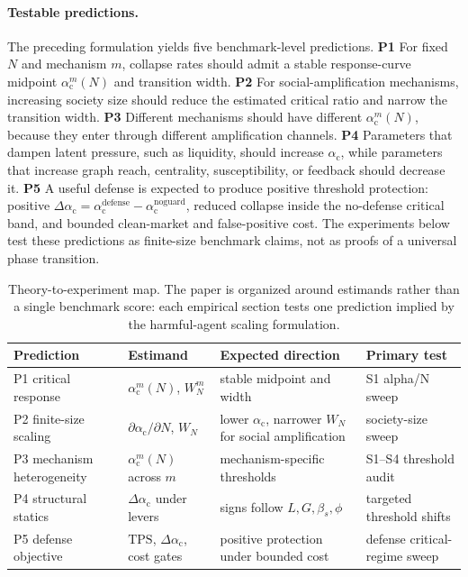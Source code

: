 \documentclass[letterpaper]{article} %
\newcommand{\alphac}{\alpha_{\mathrm{c}}}
\newcommand{\shift}{\Delta\alpha_{\mathrm{c}}}
\newcommand{\tps}{\mathrm{TPS}}
\begin{document}
\paragraph{Testable predictions.}
The preceding formulation yields five benchmark-level predictions. \textbf{P1}
For fixed \(N\) and mechanism \(m\), collapse rates should admit a stable
response-curve midpoint \(\alphac^m(N)\) and transition width. \textbf{P2} For
social-amplification mechanisms, increasing society size should reduce the
estimated critical ratio and narrow the transition width. \textbf{P3} Different
mechanisms should have different \(\alphac^m(N)\), because they enter through
different amplification channels. \textbf{P4} Parameters that dampen latent
pressure, such as liquidity, should increase \(\alphac\), while parameters that
increase graph reach, centrality, susceptibility, or feedback should decrease
it. \textbf{P5} A useful defense is expected to produce positive threshold
protection: positive \(\shift=\alphac^{\mathrm{defense}}-\alphac^{\mathrm{noguard}}\),
reduced collapse inside the no-defense critical band, and bounded
clean-market and false-positive cost. The experiments below test these
predictions as finite-size benchmark claims, not as proofs of a universal
phase transition.

\begin{table}[t]
\centering
\small
\begin{tabular}{llll}
\toprule
Prediction & Estimand & Expected direction & Primary test \\
\midrule
P1 critical response & \(\alphac^m(N)\), \(W_N^m\) & stable midpoint and width & S1 alpha/N sweep \\
P2 finite-size scaling & \(\partial\alphac/\partial N\), \(W_N\) & lower \(\alphac\), narrower \(W_N\) for social amplification & society-size sweep \\
P3 mechanism heterogeneity & \(\alphac^m(N)\) across \(m\) & mechanism-specific thresholds & S1--S4 threshold audit \\
P4 structural statics & \(\Delta\alphac\) under levers & signs follow \(L,G,\beta_s,\phi\) & targeted threshold shifts \\
P5 defense objective & \(\tps\), \(\shift\), cost gates & positive protection under bounded cost & defense critical-regime sweep \\
\bottomrule
\end{tabular}
\caption{Theory-to-experiment map. The paper is organized around estimands
rather than a single benchmark score: each empirical section tests one
prediction implied by the harmful-agent scaling formulation.}
\label{tab:prediction-map}
\end{table}
\end{document}
